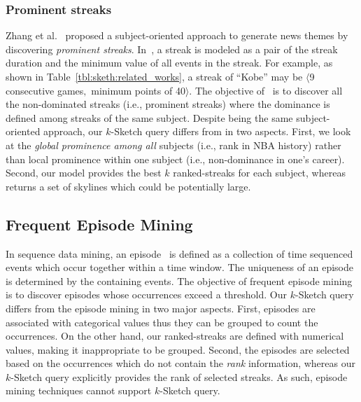 \subsubsection{Prominent streaks}
Zhang et al.~\cite{zhang2014discovering} proposed a
subject-oriented approach to generate news themes by discovering \emph{prominent streaks}. 
In~\cite{zhang2014discovering}, a streak is modeled as a pair of the streak duration and the minimum
value of all events in the streak.
For example, as shown in Table~\ref{tbl:sketh:related_works}, a streak of ``Kobe'' may be $\langle$9 consecutive games$,$ minimum points of 40$\rangle$.
The objective of~\cite{zhang2014discovering}
is to discover all the non-dominated streaks (i.e., prominent streaks) where the dominance is defined among streaks of the same subject. 
Despite being the same subject-oriented approach,
our $k$-Sketch query differs from \cite{zhang2014discovering} in two aspects. First, we look at the \emph{global prominence among all} subjects (i.e., rank in NBA history) rather than local prominence within one subject (i.e., non-dominance in one's career). 
Second, our model provides the best $k$ ranked-streaks
for each subject, whereas~\cite{zhang2014discovering} returns a set of skylines 
which could be potentially large.

 
\subsection{Frequent Episode Mining}
In sequence data mining, an episode~\cite{mannila1997discepisodes,
zhou2010serialepisodes, tatti2012strictepisodes, laxman2007nonoverlapepisodes} is 
defined as a collection of time sequenced events which occur together within a time window. The uniqueness of an episode is determined by the containing events. The objective of frequent episode mining is to discover episodes whose 
occurrences exceed a threshold.  
Our $k$-Sketch query differs from the episode mining in two major aspects. 
First, episodes are associated with categorical values thus they can be grouped to count the occurrences. 
On the other hand, our ranked-streaks are defined with numerical values, making it inappropriate to be grouped.
Second, the episodes are selected based on the occurrences 
which do not contain the \emph{rank} information, whereas our 
$k$-Sketch query explicitly provides the rank of selected streaks.  
As such, episode mining techniques cannot support $k$-Sketch query.

